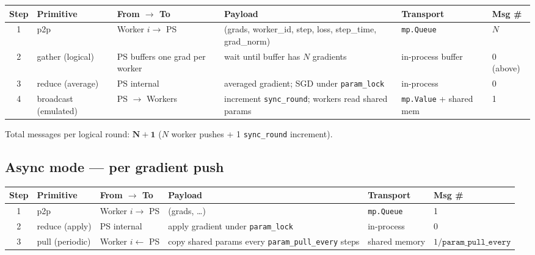 \documentclass[11pt,a4paper]{article}
\begin{document}
\begin{table}[htbp]
  \centering
  \footnotesize
  \begin{tabularx}{\linewidth}{@{}c L L L L L@{}}
    \toprule
    \textbf{Step} & \textbf{Primitive} & \textbf{From $\to$ To} & \textbf{Payload} & \textbf{Transport} & \textbf{Msg \#} \\
     & p2p & Worker $i \to$ PS & (grads, worker\_id, step, loss, step\_time, grad\_norm) & \texttt{mp.Queue} & $N$ \\
    2 & gather (logical) & PS buffers one grad per worker & wait until buffer has $N$ gradients & in-process buffer & 0 (above) \\
    3 & reduce (average) & PS internal & averaged gradient; SGD under \texttt{param\_lock} & in-process & 0 \\
    4 & broadcast (emulated) & PS $\to$ Workers & increment \texttt{sync\_round}; workers read shared params & \texttt{mp.Value} + shared mem & 1 \\
    \bottomrule
  \end{tabularx}
\end{table}

\noindent Total messages per logical round: $\mathbf{N + 1}$ ($N$ worker pushes + 1 \texttt{sync\_round} increment).

\subsection{Async mode --- per gradient push}

\begin{table}[htbp]
  \centering
  \footnotesize
  \begin{tabularx}{\linewidth}{@{}c L L L L L@{}}
    \toprule
    \textbf{Step} & \textbf{Primitive} & \textbf{From $\to$ To} & \textbf{Payload} & \textbf{Transport} & \textbf{Msg \#} \\
     & p2p & Worker $i \to$ PS & (grads, \ldots) & \texttt{mp.Queue} & 1 \\
    2 & reduce (apply) & PS internal & apply gradient under \texttt{param\_lock} & in-process & 0 \\
    3 & pull (periodic) & Worker $i \leftarrow$ PS & copy shared params every \texttt{param\_pull\_every} steps & shared memory & $1/\texttt{param\_pull\_every}$ \\
    \bottomrule
  \end{tabularx}
\end{table}
\end{document}
